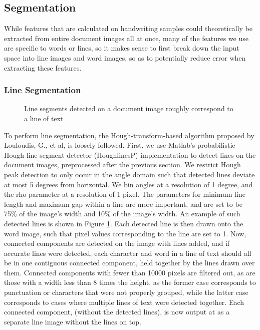 \documentclass[paper=a4, fontsize=11pt]{scrartcl} %
\numberwithin{equation}{section} %
\numberwithin{figure}{section} %
\numberwithin{table}{section} %
\begin{document}
\subsection{Segmentation}
While features that are calculated on handwriting samples could
theoretically be extracted from entire document images all at once,
many of the features we use are specific to words or lines, so it
makes sense to first break down the input space into line images and
word images, so as to potentially reduce error when extracting these
features.

\subsubsection{Line Segmentation}

\begin{figure}
  \label{fig:houghLineDetect}
  \caption{Line segments detected on a document image roughly
    correspond to a line of text}
\end{figure}

To perform line segmentation, the Hough-transform-based algorithm
proposed by Louloudis, G., et al, \cite{BlockBased} is loosely
followed. First, we use Matlab’s probabilistic Hough line segment
detector (HoughlinesP) implementation to detect lines on the document
images, preprocessed after the previous section. We restrict Hough
peak detection to only occur in the angle domain such that detected
lines deviate at most 5 degrees from horizontal. We bin angles at a
resolution of 1 degree, and the rho parameter at a resolution of 1
pixel. The parameters for minimum line length and maximum gap within a
line are more important, and are set to be 75\% of the image’s width
and 10\% of the image’s width. An example of such detected lines is
shown in Figure \ref{fig:houghLineDetect}. Each detected line is then
drawn onto the word image, such that pixel values corresponding to the
line are set to 1. Now, connected components are detected on the image
with lines added, and if accurate lines were detected, each character
and word in a line of text should all be in one contiguous connected
component, held together by the lines drawn over them. Connected
components with fewer than 10000 pixels are filtered out, as are those
with a width less than 8 times the height, as the former case
corresponds to punctuation or characters that were not properly
grouped, while the latter case corresponds to cases where multiple
lines of text were detected together. Each connected component,
(without the detected lines), is now output at as a separate line
image without the lines on top. 
\end{document}
